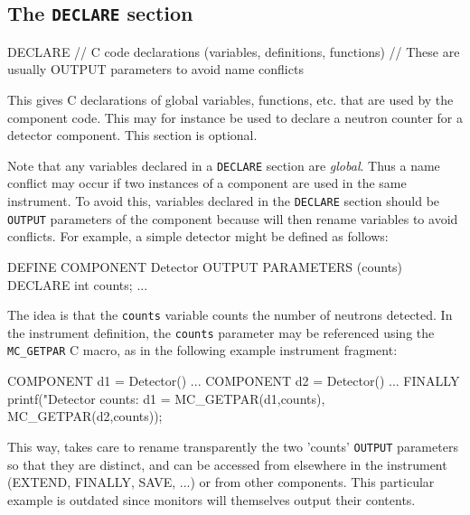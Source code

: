 \subsection{The \texttt{DECLARE} section}
\label{s:comp-declare}
\begin{mcstas}
DECLARE
// C code declarations (variables, definitions, functions)
// These are usually OUTPUT parameters to avoid name conflicts 
\end{mcstas}
 This gives C declarations of global variables,
functions, etc. that are used by the component code. This may for instance be
used to declare a neutron counter for a detector component. This section is
optional.

Note that any variables declared in a \verb+DECLARE+ section are
\emph{global}. Thus a name conflict may occur if two instances of a component
are used in the same instrument. To avoid this, variables declared in the
\texttt{DECLARE} section should be \texttt{OUTPUT} parameters of the component
because \MCS will then rename variables to avoid conflicts.  For example, a
simple detector might be defined as follows:

\begin{mcstas}
DEFINE COMPONENT Detector
OUTPUT PARAMETERS (counts)
DECLARE
  int counts;
...
\end{mcstas}

The idea is that the \texttt{counts} variable counts the number of neutrons detected. In
the instrument definition, the \texttt{counts} parameter may be referenced using
the \verb+MC_GETPAR+ C macro, as in the following example instrument
fragment:\label{mcgetpar}

\begin{mcstas}
COMPONENT d1 = Detector()
...
COMPONENT d2 = Detector()
...
FINALLY
  printf("Detector counts: d1 = %
         MC_GETPAR(d1,counts), MC_GETPAR(d2,counts));
\end{mcstas}

This way, \MCS takes care to rename transparently the two 'counts'
\texttt{OUTPUT} parameters so that they are distinct, and can be accessed from
elsewhere in the instrument (EXTEND, FINALLY, SAVE, ...)  or from other
components. This particular example is outdated since \MCS monitors will
themselves output their contents.

